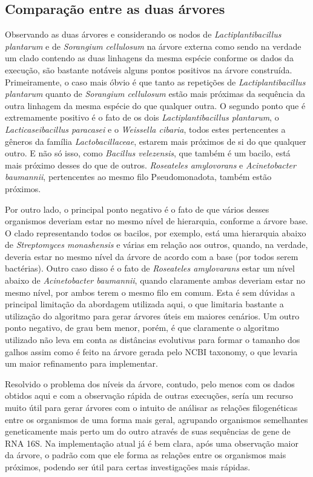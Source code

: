 \documentclass[brazilian,12pt,a4paper,final]{article}
\begin{document}
	 	
	 \subsection{Comparação entre as duas árvores}
	 
	 Observando as duas árvores e considerando os nodos de \textit{Lactiplantibacillus plantarum} e de \textit{Sorangium cellulosum} na árvore externa como sendo na verdade um clado contendo as duas linhagens da mesma espécie conforme os dados da execução, são bastante notáveis alguns pontos positivos na árvore construída. Primeiramente, o caso mais óbvio é que tanto as repetições de \textit{Lactiplantibacillus plantarum} quanto de \textit{Sorangium cellulosum} estão mais próximas da sequência da outra linhagem da mesma espécie do que qualquer outra. O segundo ponto que é extremamente positivo é o fato de os dois \textit{Lactiplantibacillus plantarum}, o \textit{Lacticaseibacillus paracasei} e o \textit{Weissella cibaria}, todos estes pertencentes a gêneros da família \textit{Lactobacillaceae}, estarem mais próximos de si do que qualquer outro. E não só isso, como \textit{Bacillus velezensis}, que também é um bacilo, está mais próximo desses do que de outros. \textit{Roseateles amylovorans} e \textit{Acinetobacter baumannii}, pertencentes ao mesmo filo Pseudomonadota, também estão próximos.
	 \vspace{0.5cm}
	 
	 Por outro lado, o principal ponto negativo é o fato de que vários desses organismos deveriam estar no mesmo nível de hierarquia, conforme a árvore base. O clado representando todos os bacilos, por exemplo, está uma hierarquia abaixo de \textit{Streptomyces monashensis} e várias em relação aos outros, quando, na verdade, deveria estar no mesmo nível da árvore de acordo com a base (por todos serem bactérias). Outro caso disso é o fato de \textit{Roseateles amylovarans} estar um nível abaixo de \textit{Acinetobacter baumannii}, quando claramente ambas deveriam estar no mesmo nível, por ambos terem o mesmo filo em comum. Esta é sem dúvidas a principal limitação da abordagem utilizada aqui, o que limitaria bastante a utilização do algoritmo para gerar árvores úteis em maiores cenários. Um outro ponto negativo, de grau bem menor, porém, é que claramente o algoritmo utilizado não leva em conta as distâncias evolutivas para formar o tamanho dos galhos assim como é feito na árvore gerada pelo NCBI taxonomy, o que levaria um maior refinamento para implementar. 
	 \vspace{0.5cm}
	 
	 Resolvido o problema dos níveis da árvore, contudo, pelo menos com os dados obtidos aqui e com a observação rápida de outras execuções, sería um recurso muito útil para gerar árvores com o intuito de análisar as relações filogenéticas entre os organismos de uma forma mais geral, agrupando organismos semelhantes geneticamente mais perto um do outro através de suas sequências de gene de RNA 16S. Na implementação atual já é bem clara, após uma observação maior da árvore, o padrão com que ele forma as relações entre os organismos mais próximos, podendo ser útil para certas investigações mais rápidas.
	
	
\end{document}
